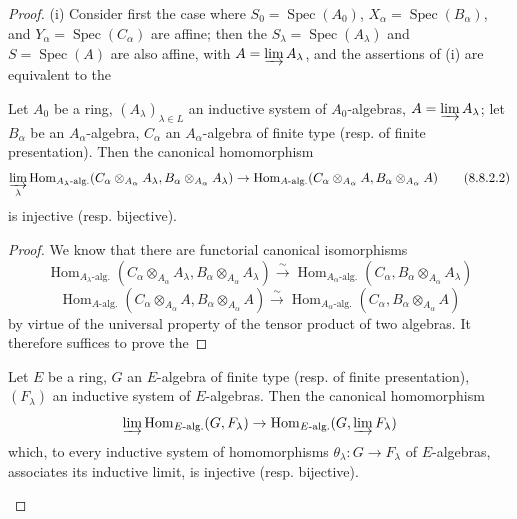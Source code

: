 \begin{proof}
(i) Consider first the case where $S_0=\operatorname{Spec}(A_0)$, $X_\alpha=\operatorname{Spec}(B_\alpha)$, and $Y_\alpha=\operatorname{Spec}(C_\alpha)$ are affine; then the $S_\lambda=\operatorname{Spec}(A_\lambda)$ and $S=\operatorname{Spec}(A)$ are also affine, with $A=\varinjlim A_\lambda$, and the assertions of (i) are equivalent to the

\begin{lemma}[8.8.2.1]
\label{IV.8.8.2.1}
Let $A_0$ be a ring, $(A_\lambda)_{\lambda\in L}$ an inductive system of $A_0$-algebras, $A=\varinjlim A_\lambda$; let $B_\alpha$ be an $A_\alpha$-algebra, $C_\alpha$ an $A_\alpha$-algebra of finite type \textup{(resp.} of finite presentation\textup{)}.
Then the canonical homomorphism
\[
  \varinjlim_\lambda\operatorname{Hom}_{A_\lambda\textup{-alg.}}(C_\alpha\otimes_{A_\alpha}A_\lambda,B_\alpha\otimes_{A_\alpha}A_\lambda)\to\operatorname{Hom}_{A\textup{-alg.}}(C_\alpha\otimes_{A_\alpha}A,B_\alpha\otimes_{A_\alpha}A)
  \tag{8.8.2.2}\label{IV.8.8.2.2}
\]
is injective \textup{(resp.} bijective\textup{)}.
\end{lemma}

\begin{proof}
We know that there are functorial canonical isomorphisms
\[
  \operatorname{Hom}_{A_\lambda\text{-alg.}}(C_\alpha\otimes_{A_\alpha}A_\lambda,B_\alpha\otimes_{A_\alpha}A_\lambda)\xrightarrow{\sim}\operatorname{Hom}_{A_\alpha\text{-alg.}}(C_\alpha,B_\alpha\otimes_{A_\alpha}A_\lambda)
\]
\[
  \operatorname{Hom}_{A\text{-alg.}}(C_\alpha\otimes_{A_\alpha}A,B_\alpha\otimes_{A_\alpha}A)\xrightarrow{\sim}\operatorname{Hom}_{A_\alpha\text{-alg.}}(C_\alpha,B_\alpha\otimes_{A_\alpha}A)
\]
by virtue of the universal property of the tensor product of two algebras.
It therefore suffices to prove the
\end{proof}

\begin{lemma}[8.8.2.3]
\label{IV.8.8.2.3}
Let $E$ be a ring, $G$ an $E$-algebra of finite type \textup{(resp.} of finite presentation\textup{)}, $(F_\lambda)$ an inductive system of $E$-algebras.
Then the canonical homomorphism
\[
  \varinjlim\operatorname{Hom}_{E\textup{-alg.}}(G,F_\lambda)\to\operatorname{Hom}_{E\textup{-alg.}}(G,\varinjlim F_\lambda)
\]
which, to every inductive system of homomorphisms $\theta_\lambda:G\to F_\lambda$ of $E$-algebras, associates its inductive limit, is injective \textup{(resp.} bijective\textup{)}.
\end{lemma}


\end{proof}
